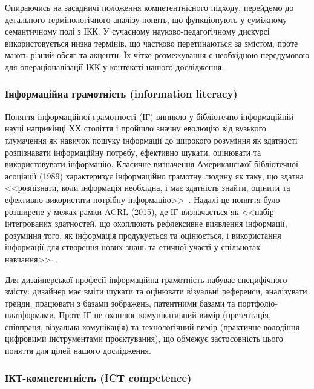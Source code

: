 
Опираючись на засадничі положення компетентнісного підходу, перейдемо до детального термінологічного аналізу понять, що функціонують у суміжному семантичному полі з ІКК. У сучасному науково-педагогічному дискурсі використовується низка термінів, що частково перетинаються за змістом, проте мають різний обсяг та акценти. Їх чітке розмежування є необхідною передумовою для операціоналізації ІКК у контексті нашого дослідження.

\subsubsection{Інформаційна грамотність (information literacy)}\label{sssec:1.1.1}

Поняття інформаційної грамотності (ІГ) виникло у бібліотечно-інформаційній науці наприкінці ХХ століття і пройшло значну еволюцію від вузького тлумачення як навичок пошуку інформації до широкого розуміння як здатності розпізнавати інформаційну потребу, ефективно шукати, оцінювати та використовувати інформацію. Класичне визначення Американської бібліотечної асоціації (1989) характеризує інформаційно грамотну людину як таку, що здатна <<розпізнати, коли інформація необхідна, і має здатність знайти, оцінити та ефективно використати потрібну інформацію>>~\cite{ALA1989Information}. Надалі це поняття було розширене у межах рамки ACRL (2015), де ІГ визначається як <<набір інтегрованих здатностей, що охоплюють рефлексивне виявлення інформації, розуміння того, як інформація продукується та оцінюється, і використання інформації для створення нових знань та етичної участі у спільнотах навчання>>~\cite{ACRL2015Framework}.

Для дизайнерської професії інформаційна грамотність набуває специфічного змісту: дизайнер має вміти шукати та оцінювати візуальні референси, аналізувати тренди, працювати з базами зображень, патентними базами та портфоліо-платформами. Проте ІГ не охоплює комунікативний вимір (презентація, співпраця, візуальна комунікація) та технологічний вимір (практичне володіння цифровими інструментами проєктування), що обмежує застосовність цього поняття для цілей нашого дослідження.

\subsubsection{ІКТ-компетентність (ICT competence)}\label{sssec:1.1.2}

